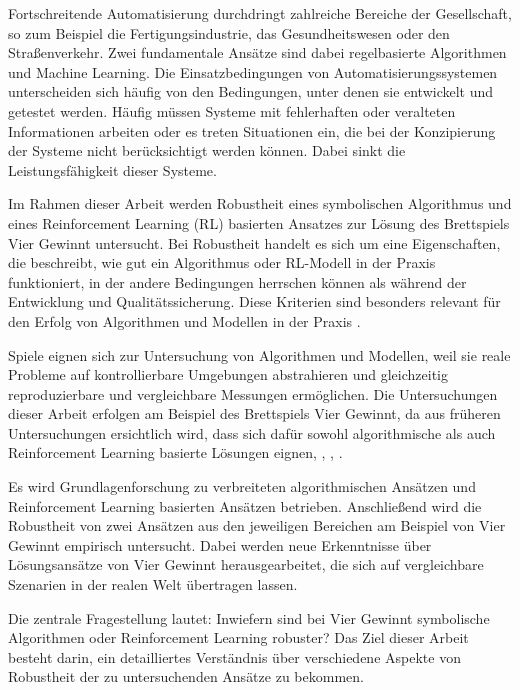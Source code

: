 Fortschreitende Automatisierung durchdringt zahlreiche Bereiche der Gesellschaft, so zum Beispiel die Fertigungsindustrie, das Gesundheitswesen oder den Straßenverkehr. Zwei fundamentale Ansätze sind dabei regelbasierte Algorithmen und Machine Learning. Die Einsatzbedingungen von Automatisierungssystemen unterscheiden sich häufig von den Bedingungen, unter denen sie entwickelt und getestet werden. Häufig müssen Systeme mit fehlerhaften oder veralteten Informationen arbeiten oder es treten Situationen ein, die bei der Konzipierung der Systeme nicht berücksichtigt werden können. Dabei sinkt die Leistungsfähigkeit dieser Systeme.

Im Rahmen dieser Arbeit werden Robustheit eines symbolischen Algorithmus und eines Reinforcement Learning (RL) basierten Ansatzes zur Lösung des Brettspiels Vier Gewinnt untersucht. Bei Robustheit handelt es sich um eine Eigenschaften, die beschreibt, wie gut ein Algorithmus oder RL-Modell in der Praxis funktioniert, in der andere Bedingungen herrschen können als während der Entwicklung und Qualitätssicherung. Diese Kriterien sind besonders relevant für den Erfolg von Algorithmen und Modellen in der Praxis \cite{Moos.2022}\cite{Ni.2021}.

Spiele eignen sich zur Untersuchung von Algorithmen und Modellen, weil sie reale Probleme auf kontrollierbare Umgebungen abstrahieren und gleichzeitig reproduzierbare und vergleichbare Messungen ermöglichen. Die Untersuchungen dieser Arbeit erfolgen am Beispiel des Brettspiels Vier Gewinnt, da aus früheren Untersuchungen ersichtlich wird, dass sich dafür sowohl algorithmische als auch Reinforcement Learning basierte Lösungen eignen\cite{Qiu.2022}\cite{Sheoran.2022}\cite{Alderton.2019}, \cite{Taylor.2024}, \cite{Dabas.2022}, \cite{Wäldchen.2022}.

Es wird Grundlagenforschung zu verbreiteten algorithmischen Ansätzen und Reinforcement Learning basierten Ansätzen betrieben. Anschließend wird die Robustheit von zwei Ansätzen aus den jeweiligen Bereichen am Beispiel von Vier Gewinnt empirisch untersucht. Dabei werden neue Erkenntnisse über Lösungsansätze von Vier Gewinnt herausgearbeitet, die sich auf vergleichbare Szenarien in der realen Welt übertragen lassen.

Die zentrale Fragestellung lautet: Inwiefern sind bei Vier Gewinnt symbolische Algorithmen oder Reinforcement Learning robuster? Das Ziel dieser Arbeit besteht darin, ein detailliertes Verständnis über verschiedene Aspekte von Robustheit der zu untersuchenden Ansätze zu bekommen.
